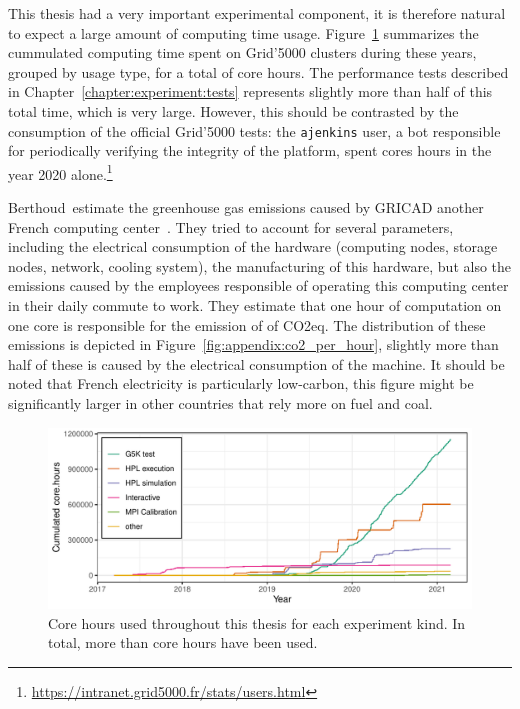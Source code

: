         This thesis had a very important experimental component, it is therefore natural to expect a large amount of
        computing time usage. Figure~\ref{fig:appendix:node_hours} summarizes the cummulated computing time spent on
        Grid'5000 clusters during these years, grouped by usage type, for a total of  core hours. The
        performance tests described in Chapter~\ref{chapter:experiment:tests} represents slightly more than half of this
        total time, which is very large. However, this should be contrasted by the consumption of the official Grid'5000
        tests: the \texttt{ajenkins} user, a bot responsible for periodically verifying the integrity of the platform,
        spent  cores hours in the year 2020
        alone.\footnote{\url{https://intranet.grid5000.fr/stats/users.html}}

        Berthoud~\etal estimate the greenhouse gas emissions caused by GRICAD another French computing
        center~\cite{corehour_co2}. They tried to account for several parameters, including the electrical consumption
        of the hardware (computing nodes, storage nodes, network, cooling system), the manufacturing of this hardware,
        but also the emissions caused by the employees responsible of operating this computing center in their daily
        commute to work. They estimate that one hour of computation on one core is responsible for the emission of
         of CO2eq. The distribution of these emissions is depicted in
        Figure~\ref{fig:appendix:co2_per_hour}, slightly more than half of these  is caused by the
        electrical consumption of the machine. It should be noted that French electricity is particularly low-carbon,
        this figure might be significantly larger in other countries that rely more on fuel and coal.

        \begin{figure}[htpb]
            \centering
            \includegraphics[width=\linewidth]{img/appendix/carbon/node_hours.pdf}
            \caption{Core hours used throughout this thesis for each experiment kind. In total, more than
             core hours have been used.}%
            \label{fig:appendix:node_hours}
        \end{figure}

